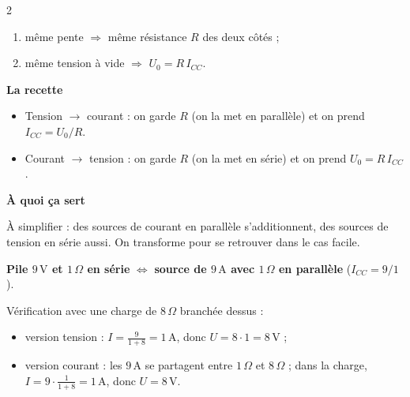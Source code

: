 \documentclass[a4paper,9pt]{extarticle}
\begin{document}
\begin{multicols}{2}
\begin{important}
\begin{enumerate}[leftmargin=*,itemsep=1pt,topsep=1pt]

\item même pente $\Rightarrow$ même résistance $R$ des deux côtés ;

\item même tension à vide $\Rightarrow$ $U_0 = R\,I_{CC}$.

\end{enumerate}

\textbf{La recette}

\begin{itemize}

\item Tension $\to$ courant : on garde $R$ (on la met en parallèle) et on prend $I_{CC} = U_0/R$.

\item Courant $\to$ tension : on garde $R$ (on la met en série) et on prend $U_0 = R\,I_{CC}$.

\end{itemize}

\textbf{À quoi ça sert}

À simplifier : des sources de courant en parallèle s'additionnent, des sources de tension en série aussi. On transforme pour se retrouver dans le cas facile.

\end{important}


\begin{example}

\textbf{Pile $9\,\text{V}$ et $1\,\Omega$ en série} $\Leftrightarrow$ \textbf{source de $9\,\text{A}$ avec $1\,\Omega$ en parallèle} ($I_{CC} = 9/1$).

\vspace{3pt}

Vérification avec une charge de $8\,\Omega$ branchée dessus :

\begin{itemize}

\item version tension : $I = \frac{9}{1 + 8} = 1\,\text{A}$, donc $U = 8 \cdot 1 = 8\,\text{V}$ ;

\item version courant : les $9\,\text{A}$ se partagent entre $1\,\Omega$ et $8\,\Omega$ ; dans la charge, $I = 9\cdot\frac{1}{1 + 8} = 1\,\text{A}$, donc $U = 8\,\text{V}$.

\end{itemize}


\end{example}
\end{multicols}
\end{document}
